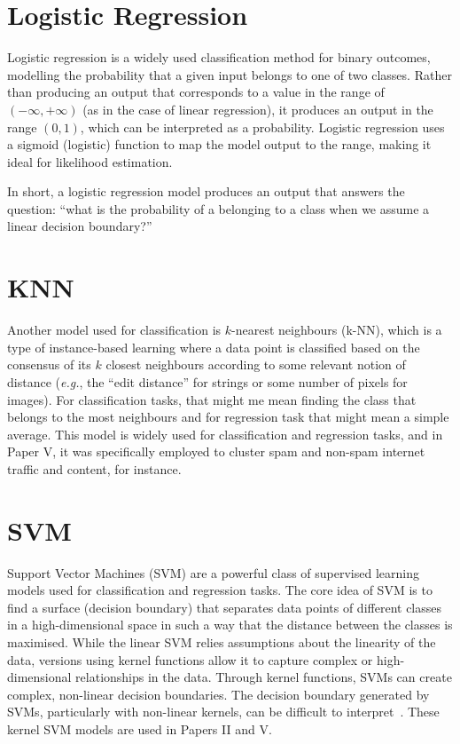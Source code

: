 \section{Logistic Regression}
Logistic regression is a widely used classification method for binary outcomes, modelling the probability that a given input belongs to one of two classes. 
Rather than producing an output that corresponds to a value in the range of  $(-\infty, +\infty)$ (as in the case of linear regression), it produces an output in the range $(0,1)$, which can be interpreted as a probability. 
Logistic regression uses a sigmoid (logistic) function to map the model output to the range, making it ideal for likelihood estimation. 

In short, a logistic regression model produces an output that answers the question: ``what is the probability of a belonging to a class when we assume a linear decision boundary?''

\section{KNN}
Another model used for classification is $k$-nearest neighbours (k-NN), which is a type of instance-based learning where a data point is classified based on the consensus of its $k$ closest neighbours according to some relevant notion of distance (\textit{e.g.}, the ``edit distance'' for strings or some number of pixels for images).
For classification tasks, that might me mean finding the class that belongs to the most neighbours and for regression task that might mean a simple average.
This model is widely used for classification and regression tasks, and in Paper V, it was specifically employed to cluster spam and non-spam internet traffic and content, for instance.

\section{SVM}
Support Vector Machines (SVM) are a powerful class of supervised learning models used for classification and regression tasks. 
The core idea of SVM is to find a surface (decision boundary) that separates data points of different classes in a high-dimensional space in such a way that the distance between the classes is maximised.
While the linear SVM relies assumptions about the linearity of the data, versions using kernel functions allow it to capture complex or high-dimensional relationships in the data.
Through kernel functions, SVMs can create complex, non-linear decision boundaries. 
The decision boundary generated by SVMs, particularly with non-linear kernels, can be difficult to interpret~\cite{shalev2014understanding}.
These kernel SVM models are used in Papers II and V. 

